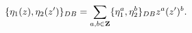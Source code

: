 \begin{equation}
\{\eta_1(z),\eta_2(z') \}_{DB}
=\sum_{a,b\in {\bf Z} }\{\eta^a_1,\eta^b_2\}_{DB}z^a (z')^b.
\label{summ}
\end{equation}

